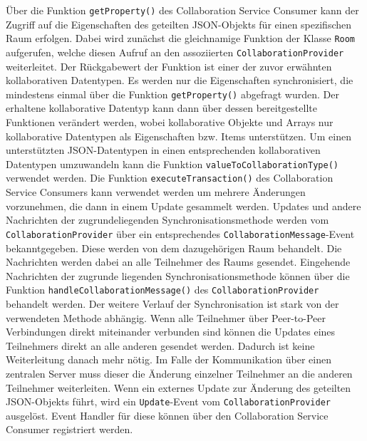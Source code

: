 Über die Funktion \texttt{getProperty()} des Collaboration Service Consumer kann der Zugriff auf die Eigenschaften des geteilten JSON-Objekts für einen spezifischen Raum erfolgen. Dabei wird zunächst die gleichnamige Funktion der Klasse \texttt{Room} aufgerufen, welche diesen Aufruf an den assoziierten \texttt{CollaborationProvider} weiterleitet. Der Rückgabewert der Funktion ist einer der zuvor erwähnten kollaborativen Datentypen. Es werden nur die Eigenschaften synchronisiert, die mindestens einmal über die Funktion \texttt{getProperty()} abgefragt wurden. Der erhaltene kollaborative Datentyp kann dann über dessen bereitgestellte Funktionen verändert werden, wobei kollaborative Objekte und Arrays nur kollaborative Datentypen als Eigenschaften bzw. Items unterstützen. Um einen unterstützten JSON-Datentypen in einen entsprechenden kollaborativen Datentypen umzuwandeln kann die Funktion \texttt{valueToCollaborationType()} verwendet werden. Die Funktion \texttt{executeTransaction()} des Collaboration Service Consumers kann verwendet werden um mehrere Änderungen vorzunehmen, die dann in einem Update gesammelt werden. Updates und andere Nachrichten der zugrundeliegenden Synchronisationsmethode werden vom \texttt{CollaborationProvider} über ein entsprechendes \texttt{CollaborationMessage}-Event bekanntgegeben. Diese werden von dem dazugehörigen Raum behandelt. Die Nachrichten werden dabei an alle Teilnehmer des Raums gesendet. Eingehende Nachrichten der zugrunde liegenden Synchronisationsmethode können über die Funktion \texttt{handleCollaborationMessage()} des \texttt{CollaborationProvider} behandelt werden. Der weitere Verlauf der Synchronisation ist stark von der verwendeten Methode abhängig. Wenn alle Teilnehmer über Peer-to-Peer Verbindungen direkt miteinander verbunden sind können die Updates eines Teilnehmers direkt an alle anderen gesendet werden. Dadurch ist keine Weiterleitung danach mehr nötig. Im Falle der Kommunikation über einen zentralen Server muss dieser die Änderung einzelner Teilnehmer an die anderen Teilnehmer weiterleiten. Wenn ein externes Update zur Änderung des geteilten JSON-Objekts führt, wird ein \texttt{Update}-Event vom \texttt{CollaborationProvider} ausgelöst. Event Handler für diese können über den Collaboration Service Consumer registriert werden.

